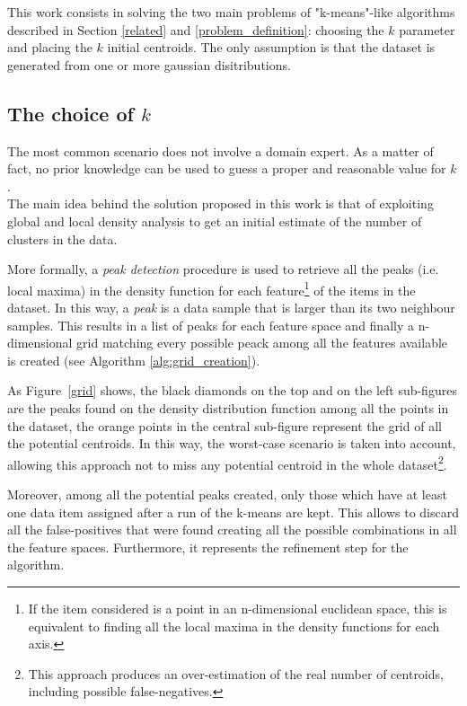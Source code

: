 This work consists in solving the two main problems of "k-means"-like 
algorithms described in Section \ref{related} and \ref{problem_definition}:
choosing the $k$ parameter and placing the $k$ initial centroids.
The only assumption is that the dataset is generated from one or more gaussian
disitributions.


\subsection{The choice of $k$}
The most common scenario does not involve a domain expert. As a matter of fact, 
no prior knowledge can be used to guess a proper and reasonable value for $k$.\\
The main idea behind the solution proposed in this work is that of exploiting global
and local density analysis to get an initial estimate of the number of clusters
in the data.

More formally, a \emph{peak detection} procedure is used to retrieve 
all the peaks (i.e. local maxima) in the density function for each feature\footnote{If
the item considered is a point in an n-dimensional euclidean space, this is equivalent to
finding all the local maxima in the density functions for each axis.} of the items in 
the dataset. In this way, a \emph{peak} is a data sample that is larger than 
its two neighbour samples.
This results in a list of peaks for each feature space and finally a n-dimensional grid
matching every possible peack among all the features available is created
(see Algorithm \ref{alg:grid_creation}).


As Figure~\ref{grid} shows, the black diamonds on the top and on
the left sub-figures are the peaks found on the density distribution function among all
the points in the dataset, the orange points in the central sub-figure represent the
grid of all the potential centroids.
In this way, the worst-case scenario is taken into account, allowing this approach not
to miss any potential centroid in the whole dataset\footnote{This approach produces an 
over-estimation of the real number of centroids, including possible false-negatives.}.

\begin{figure*}
  \caption{The grid with all the potential centroids computed from the peaks.}
  \label{grid}
\end{figure*}

Moreover, among all the potential peaks created, only those which have at least one data
item assigned after a run of the k-means are kept. This allows to discard all the 
false-positives that were found creating all the possible combinations in all the feature spaces.
Furthermore, it represents the refinement step for the algorithm.

